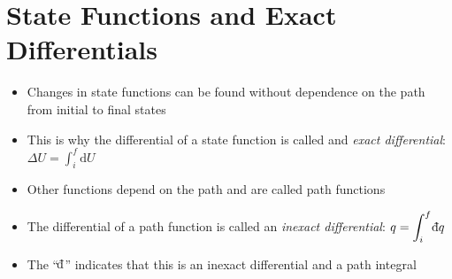 \documentclass[12pt, openany, letterpaper]{memoir}
\begin{document}
\section{State Functions and Exact Differentials}
\begin{itemize}
	\item Changes in state functions can be found without dependence on the path from initial to final states
	\item This is why the differential of a state function is called and \emph{exact differential}: $\Delta U = \displaystyle\int_i^f\mathrm{d}U$
	\item Other functions depend on the path and are called path functions
	\item The differential of a path function is called an \emph{inexact differential}: $q=\displaystyle\int_i^f\dbar q$
	\item The ``$\dbar$'' indicates that this is an inexact differential and a path integral
\end{itemize}
\end{document}
